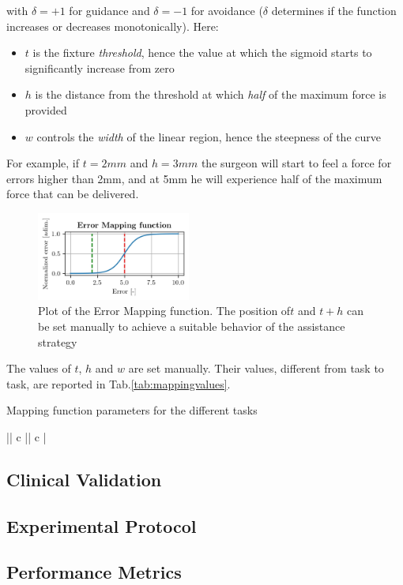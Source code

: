\documentclass[../main.tex]{subfiles}
\begin{document}
with $\delta = +1$ for guidance \vfs and $\delta = -1$ for avoidance \vfs ($\delta$ determines if the function increases or decreases monotonically). Here:
\begin{itemize}
  \item $t$ is the fixture \textit{threshold}, hence the value at which the sigmoid starts to significantly increase from zero
  \item $h$ is the distance from the threshold at which \textit{half} of the maximum force is provided
  \item $w$ controls the \textit{width} of the linear region, hence the steepness of the curve 
\end{itemize}
For example, if $t=2\si{mm}$ and $h=3\si{mm}$ the surgeon will start to feel a force for errors higher than 2\si{mm}, and at 5\si{mm} he will experience half of the maximum force that can be delivered.

\begin{figure}[h!]
  \centering
      \includegraphics[width=0.45\textwidth]{images/mappingfunction.jpg}
      \caption{Plot of the Error Mapping function. The position of$t$ and $t+h$ can be set manually to achieve a suitable behavior of the assistance strategy}
      \label{fig:mappingfunctiion}
\end{figure}

The values of $t$, $h$ and $w$ are set manually. Their values, different from task to task, are reported in Tab.\ref{tab:mappingvalues}.

\begin{table}
  \centering
  \caption{Mapping function parameters for the different tasks}
  || c || c |
  \label{tab:mappingvalues}
\end{table}

\subsection{Clinical Validation}
\subsection{Experimental Protocol}
\subsection{Performance Metrics}




\end{document}
